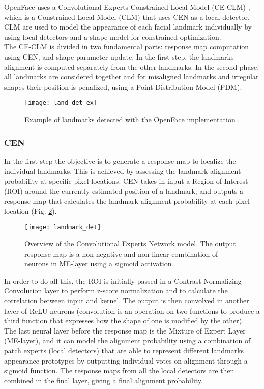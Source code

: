 OpenFace uses a Convolutional Experts Constrained Local Model (CE-CLM) \cite{Baltru2017}, which is a Constrained Local Model (CLM) that uses CEN as a local detector. CLM are used to model the appearance of each facial landmark individually by using local detectors and a shape model for constrained optimization.\\
The CE-CLM is divided in two fundamental parts: response map computation using CEN, and shape parameter update. In the first step, the landmarks alignment is computed separately from the other landmarks. In the second phase, all landmarks are considered together and for misaligned landmarks and irregular shapes their position is penalized, using a Point Distribution Model (PDM).\\

\begin{figure}[H]
	\centering
	\texttt{[image: land\_det\_ex]}
	\caption{Example of landmarks detected with the OpenFace implementation \cite{Baltru2018}.}
	\label{fig:land_det_ex}
\end{figure}

\subsubsection{CEN}
In the first step the objective is to generate a response map to localize the individual landmarks. This is achieved by assessing the landmark alignment probability at specific pixel locations. CEN takes in input a Region of Interest (ROI) around the currently estimated position of a landmark, and outputs a response map that calculates the landmark alignment probability at each pixel location (Fig. \ref{fig:landmark_det}). \\
\begin{figure}[H]
	\centering
	\texttt{[image: landmark\_det]}
	\caption{Overview of the Convolutional Experts Network model. The output response map is a non-negative and non-linear combination of neurons in ME-layer using a sigmoid activation \cite{Baltru2017}.}
	\label{fig:landmark_det}
\end{figure}
In order to do all this, the ROI is initially passed in a Contrast Normalizing Convolution layer to perform z-score normalization and to calculate the correlation between input and kernel. The output is then convolved in another layer of ReLU neurons (convolution is an operation on two functions to produce a third function that expresses how the shape of one is modified by the other). \\
The last neural layer before the response map is the Mixture of Expert Layer (ME-layer), and it can model the alignment probability using a combination of patch experts (local detectors) that are able to represent different landmarks appearance prototypes by outputting individual votes on alignment through a sigmoid function. The response maps from all the local detectors are then combined in the final layer, giving a final alignment probability.

